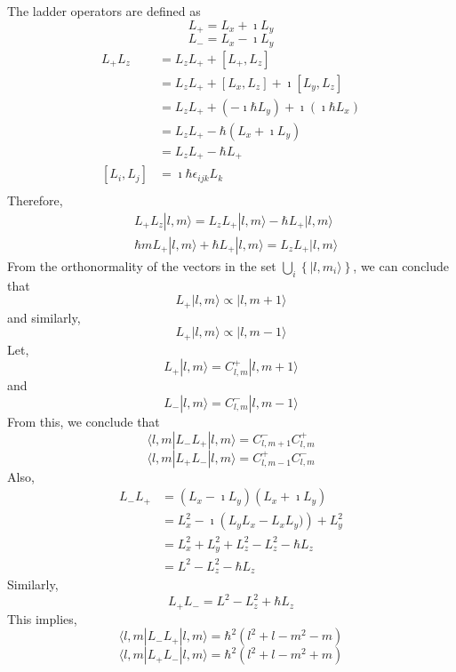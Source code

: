 \documentclass{article}
\begin{document}
The ladder operators are defined as
$$L_{+} = L_{x} + \imath L_{y}$$
$$L_{-} = L_{x} - \imath L_{y}$$
\begin{align*}
    L_{+}L_{z} & = L_{z}L_{+} + [L_{+},L_{z}] \\
    & = L_{z}L_{+} + [L_{x},L_{z}] + \imath [L_{y},L_{z}] \\
    & = L_{z}L_{+} + (-\imath \hbar L_{y}) + \imath (\imath \hbar L_{x}) \\
    & = L_{z}L_{+} -\hbar (L_{x} + \imath L_{y} ) \\
    & = L_{z}L_{+} -\hbar L_{+} \\
    \left[L_{i},L_{j}\right] & =  \imath \hbar \epsilon_{ijk}L_{k}  \\
\end{align*}
Therefore,
\begin{align*}
    & L_{+}L_{z} | l,m \rangle  = L_{z}L_{+} | l,m \rangle - \hbar L_{+} | l,m \rangle \\
    & \hbar mL_{+} | l,m \rangle + \hbar L_{+} | l,m \rangle = L_{z}L_{+} | l,m \rangle
\end{align*}
From the orthonormality of the vectors in the set $\bigcup_{i} \left\{|l,m_{i} \rangle \right\}$, we can conclude that
$$L_{+} | l,m \rangle \propto |l, m+1 \rangle$$ and similarly,
$$L_{+} | l,m \rangle \propto |l, m-1 \rangle$$
Let,
$$L_{+} | l,m \rangle = C^{+}_{l,m} | l,m+1 \rangle$$ and
$$L_{-} | l,m \rangle = C^{-}_{l,m} | l,m-1 \rangle$$
From this, we conclude that
$$\langle l,m | L_{-}L_{+} | l,m \rangle = C^{-}_{l,m+1}C^{+}_{l,m}$$
$$\langle l,m | L_{+}L_{-} | l,m \rangle = C^{+}_{l,m-1}C^{-}_{l,m}$$
Also,
\begin{align*}
L_{-}L_{+} & = \left( L_{x} - \imath L_{y} \right)\left( L_{x} + \imath L_{y} \right) \\
    & = L^{2}_{x} -\imath \left( L_{y}L_{x} - L_{x}L_{y}) \right) + L^{2}_{y} \\
    & = L^{2}_{x} + L^{2}_{y} + L^{2}_{z} - L^{2}_{z} - \hbar L_{z} \\
    & = L^{2} - L^{2}_{z} - \hbar L_{z}
\end{align*}
 Similarly,
$$L_{+}L_{-} = L^{2} - L^{2}_{z} + \hbar L_{z} $$
This implies,
$$\langle l,m | L_{-}L_{+} | l, m \rangle = \hbar^{2} (l^{2} + l - m^{2} - m)$$
$$\langle l,m | L_{+}L_{-} | l, m \rangle = \hbar^{2} (l^{2} + l - m^{2} + m)$$
\end{document}
